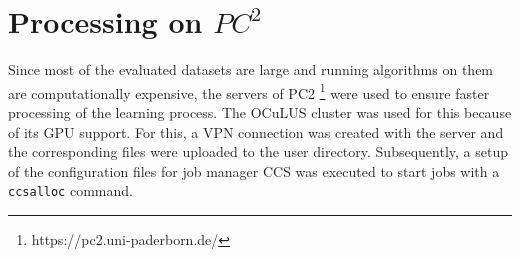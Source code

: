 \section{Processing on $PC^2$}
\label{sec:processing_on_pc2}
%
Since most of the evaluated datasets are large and running algorithms on them are computationally expensive, the servers of \ac{PC2} \footnote{https://pc2.uni-paderborn.de/} were used to ensure faster processing of the learning process.
The \ac{OCuLUS} cluster was used for this because of its GPU support.
For this, a \ac{VPN} connection was created with the server and the corresponding files were uploaded to the user directory.
Subsequently, a setup of the configuration files for job manager CCS was executed to start jobs with a \texttt{ccsalloc} command.
